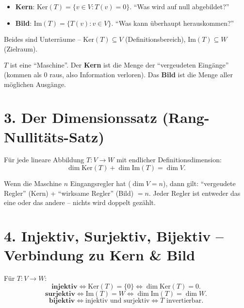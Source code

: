 \documentclass[a4paper,12pt]{article}
\begin{document}
\begin{merkbox}[title={Definitionen}]
\begin{itemize}[nosep]
    \item \textbf{Kern}: $\text{Ker}(T) = \{v \in V : T(v) = 0\}$. ``Was wird auf null abgebildet?''
    \item \textbf{Bild}: $\text{Im}(T) = \{T(v) : v \in V\}$. ``Was kann \"uberhaupt herauskommen?''
\end{itemize}
Beides sind Unterr\"aume -- $\text{Ker}(T) \subseteq V$ (Definitionsbereich), $\text{Im}(T) \subseteq W$ (Zielraum).
\end{merkbox}

\begin{analogie}
$T$ ist eine ``Maschine''. Der \textbf{Kern} ist die Menge der ``vergeudeten Eing\"ange'' (kommen als $0$ raus, also Information verloren). Das \textbf{Bild} ist die Menge aller m\"oglichen Ausg\"ange.
\end{analogie}

\section*{3. Der Dimensionssatz (Rang-Nullit\"ats-Satz)}

\begin{merkbox}[title={Der wichtigste Satz}]
F\"ur jede lineare Abbildung $T \colon V \to W$ mit endlicher Definitionsdimension:
\[
\dim \text{Ker}(T) + \dim \text{Im}(T) = \dim V.
\]
\end{merkbox}

\begin{analogie}
Wenn die Maschine $n$ Eingangsregler hat ($\dim V = n$), dann gilt: ``vergeudete Regler'' (Kern) + ``wirksame Regler'' (Bild) $= n$. Jeder Regler ist entweder das eine oder das andere -- nichts wird doppelt gez\"ahlt.
\end{analogie}

\section*{4. Injektiv, Surjektiv, Bijektiv -- Verbindung zu Kern \& Bild}

\begin{merkbox}[title={Charakterisierungen}]
F\"ur $T \colon V \to W$:
\[
\textbf{injektiv} \iff \text{Ker}(T) = \{0\} \iff \dim \text{Ker}(T) = 0.
\]
\[
\textbf{surjektiv} \iff \text{Im}(T) = W \iff \dim \text{Im}(T) = \dim W.
\]
\[
\textbf{bijektiv} \iff \text{injektiv und surjektiv} \iff T \text{ invertierbar}.
\]
\end{merkbox}
\end{document}
